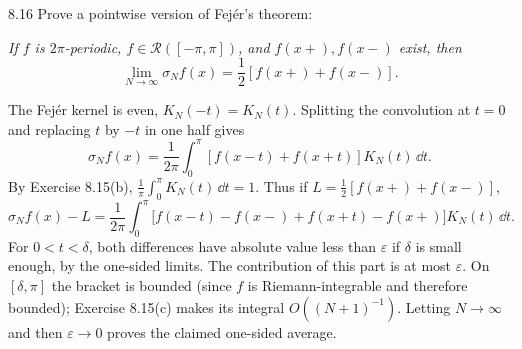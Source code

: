 \documentclass[11pt, oneside]{article}
\begin{document}
\begin{exercise}{8.16}
Prove a pointwise version of Fej\'er's theorem:

\emph{If $f$ is $2\pi$-periodic, $f\in\mathcal{R}([-\pi, \pi])$, and $f(x+), f(x-)$ exist, then}
\[
 \lim_{N\to\infty}\sigma_Nf(x)=\frac12[f(x+)+f(x-)].
\]
\end{exercise}
\begin{solution}
The Fej\'er kernel is even, $K_N(-t)=K_N(t)$. Splitting the convolution at $t=0$ and replacing $t$ by $-t$ in one half gives
\[
 \sigma_Nf(x)=\frac1{2\pi}\int_0^\pi[f(x-t)+f(x+t)]K_N(t)\,\dd t.
\]
By Exercise 8.15(b), $\frac1\pi\int_0^\pi K_N(t)\,\dd t=1$. Thus if $L=\tfrac12[f(x+)+f(x-)]$,
\[
 \sigma_Nf(x)-L
 =\frac1{2\pi}\int_0^\pi
 \bigl[f(x-t)-f(x-)+f(x+t)-f(x+)\bigr]K_N(t)\,\dd t.
\]
For $0<t<\delta$, both differences have absolute value less than $\varepsilon$ if $\delta$ is small enough, by the one-sided limits. The contribution of this part is at most $\varepsilon$. On $[\delta, \pi]$ the bracket is bounded (since $f$ is Riemann-integrable and therefore bounded); Exercise 8.15(c) makes its integral $O((N+1)^{-1})$. Letting $N\to\infty$ and then $\varepsilon\to0$ proves the claimed one-sided average.
\end{solution}
\end{document}
